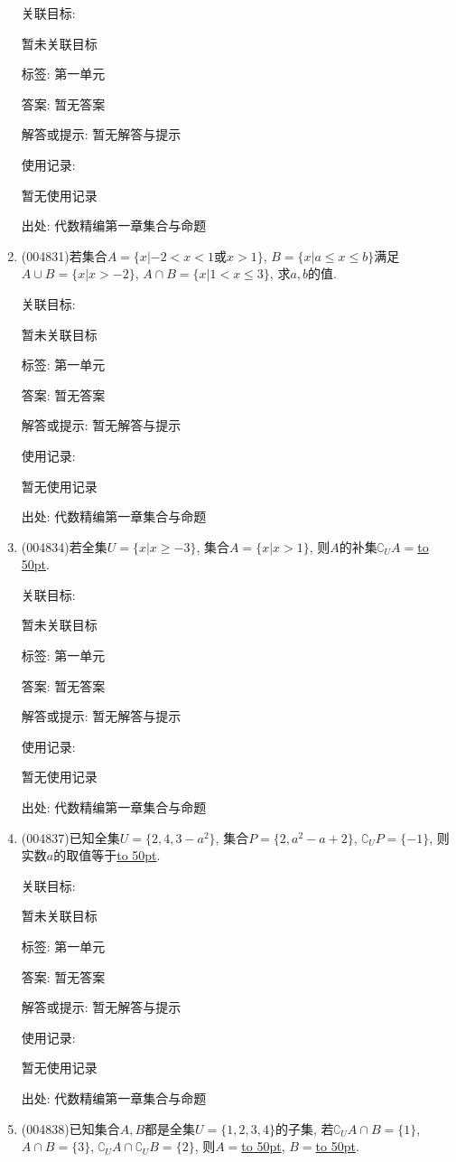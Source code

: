 \documentclass[10pt,a4paper]{article}
\newcommand{\blank}[1]{\underline{\hbox to #1pt{}}}
\begin{document}
\begin{enumerate}[1.]
关联目标:

暂未关联目标



标签: 第一单元

答案: 暂无答案

解答或提示: 暂无解答与提示

使用记录:

暂无使用记录


出处: 代数精编第一章集合与命题
\item { (004831)}若集合$A=\{x|-2<x<1\text{或}x>1\}$, $B=\{x|a\le x\le b\}$满足$A\cup B=\{x|x>-2\}$, $A\cap B=\{x|1<x\le 3\}$, 求$a,b$的值.


关联目标:

暂未关联目标



标签: 第一单元

答案: 暂无答案

解答或提示: 暂无解答与提示

使用记录:

暂无使用记录


出处: 代数精编第一章集合与命题
\item { (004834)}若全集$U=\{x|x\ge -3\}$, 集合$A=\{x|x>1\}$, 则$A$的补集$\complement_UA=$\blank{50}.


关联目标:

暂未关联目标



标签: 第一单元

答案: 暂无答案

解答或提示: 暂无解答与提示

使用记录:

暂无使用记录


出处: 代数精编第一章集合与命题
\item { (004837)}已知全集$U=\{2,4,3-a^2\}$, 集合$P=\{2,a^2-a+2\}$, $\complement_UP=\{-1\}$, 则实数$a$的取值等于\blank{50}.


关联目标:

暂未关联目标



标签: 第一单元

答案: 暂无答案

解答或提示: 暂无解答与提示

使用记录:

暂无使用记录


出处: 代数精编第一章集合与命题
\item { (004838)}已知集合$A,B$都是全集$U=\{1,2,3,4\}$的子集, 若$\complement_UA\cap B=\{1\}$, $A\cap B=\{3\}$, $\complement_UA\cap \complement_UB=\{2\}$, 则$A=$\blank{50}, $B=$\blank{50}.



\end{enumerate}
\end{document}
